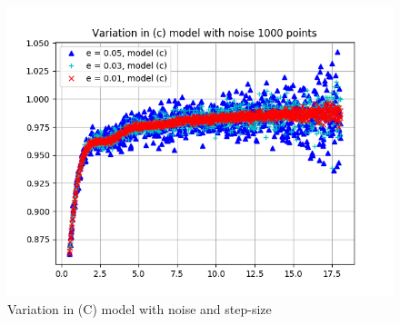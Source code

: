 \documentclass[a4paper]{article}
\begin{document}
\begin{figure}
\includegraphics[width=\columnwidth]{Figure_1-8.png}
\caption{Variation in (C) model with noise and step-size}
\end{figure}
\end{document}
